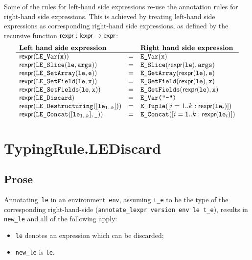 \documentclass{book}
\newcommand\Ignore[0]{\texttt{\_}}
\newcommand\vx[0]{\texttt{x}}
\newcommand\ve[0]{\texttt{e}}
\newcommand\vle[0]{\texttt{le}}
\newcommand\torexpr[0]{\textsf{rexpr}}
\newcommand\vargs[0]{\texttt{args}}
\begin{document}
Some of the rules for left-hand side expressions re-use the annotation rules for right-hand side expressions.
This is achieved by treating left-hand side expressions as corresponding right-hand side expressions,
as defined by the recursive function $\torexpr : \lexpr \rightarrow \expr$:
\[
\begin{array}{lcl}
  \textbf{Left hand side expression} & & \textbf{Right hand side expression}\\
  \hline
  \torexpr(\texttt{LE\_Var}(\vx)) &=& \texttt{E\_Var}(\vx)\\
  \torexpr(\leslice(\vle, \vargs)) &=& \texttt{E\_Slice}(\torexpr(\vle), \vargs)\\
  \torexpr(\texttt{LE\_SetArray}(\vle, \ve)) &=& \texttt{E\_GetArray}(\torexpr(\vle), \ve)\\
  \torexpr(\texttt{LE\_SetField}(\vle, \vx)) &=& \texttt{E\_GetField}(\torexpr(\vle), \vx)\\
  \torexpr(\texttt{LE\_SetFields}(\vle, \vx)) &=& \texttt{E\_GetFields}(\torexpr(\vle), \vx)\\
  \torexpr(\texttt{LE\_Discard}) &=& \texttt{E\_Var("-")}\\
  \torexpr(\texttt{LE\_Destructuring}([\vle_{1..k}])) &=& \texttt{E\_Tuple}([i=1..k: \torexpr(\vle_i)])\\
  \torexpr(\texttt{LE\_Concat}([\vle_{1..k}], \Ignore)) &=& \texttt{E\_Concat}([i=1..k: \torexpr(\vle_i)])\\
\end{array}
\]

\section{TypingRule.LEDiscard \label{sec:TypingRule.LEDiscard}}

  \subsection{Prose}
   Annotating~\texttt{le} in an environment~\texttt{env}, assuming
\texttt{t\_e} to be the type of the corresponding right-hand-side
(\texttt{annotate\_lexpr version env le t\_e}), results in \texttt{new\_le} and
all of the following apply:
   \begin{itemize}
   \item \texttt{le} denotes an expression which can be discarded;
   \item \texttt{new\_le} is \texttt{le}.
   \end{itemize}
\end{document}
